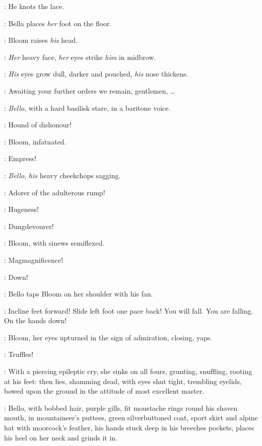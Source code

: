 :
He knots the lace.


:
Bella places \emph{her} foot on the floor.

:
Bloom raises \emph{his} head.

:
\emph{Her} heavy face, \emph{her} eyes strike \emph{him} in midbrow.

:
\emph{His} eyes grow dull, darker and pouched, \emph{his} nose thickens.

\Bloom:
Awaiting your further orders we remain, gentlemen, \ldots

:
\emph{Bello}, with a hard basilisk stare, in a baritone voice.

\Bello:
Hound of dishonour!

:
Bloom, infatuated.

\Bloom:
Empress!

:
\emph{Bello}, \emph{his} heavy cheekchops sagging.

\Bello:
Adorer of the adulterous rump!

\Bloom:
Hugeness!

\Bello:
Dungdevourer!

:
Bloom, with sinews semiflexed.

\Bloom:
Magmagnificence!

\Bello:
Down!

:
Bello taps Bloom on her shoulder with his fan.

\Bello:
Incline feet forward!
Slide left foot one pace back!
You will fall.
You are falling.
On the hands down!

:
Bloom, her eyes upturned in the sign of admiration, closing, yaps.

\Bloom:
Truffles!

:
With a piercing epileptic cry, she sinks on all fours,
grunting, snuffling, rooting at his feet:
then lies, shamming dead, with eyes shut tight, trembling eyelids,
bowed upon the ground in the attitude of most excellent master.

:
Bello, with bobbed hair, purple gills, fit moustache rings round his shaven mouth,
in mountaineer's puttees, green silverbuttoned coat,
sport skirt and alpine hat with moorcock's feather,
his hands stuck deep in his breeches pockets,
places his heel on her neck and grinds it in.

